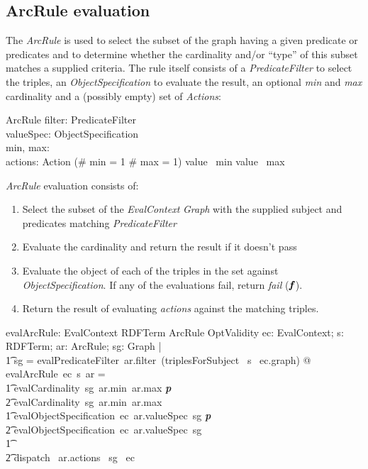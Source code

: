 \documentclass[fuzz]{llncs}
\def\pass{\textbf{\textit{p}}}
\def\fail{\textbf{\textit{f}}}
\def\zc{\textit}
\begin{document}
\subsection{ArcRule evaluation}
The \zc{ArcRule} is used to select the subset of the graph having a given predicate or
predicates and to determine whether the cardinality and/or ``type'' of this subset matches
a supplied criteria. The rule itself consists of a \zc{PredicateFilter} to select the triples,
 an \zc{ObjectSpecification} to evaluate the result, an optional \zc{min} and \zc{max}
 cardinality and a (possibly empty) set of \zc{Actions}:
\begin{schema}{ArcRule}
   filter: PredicateFilter \\
   valueSpec: ObjectSpecification \\
   min, max: \optional[\nat] \\
   actions: \power Action
\where
   (\# min = 1 \land \# max = 1) \implies value~ min \leq value~ max
\end{schema}
\zc{ArcRule} evaluation consists of:
\begin{enumerate}
\item Select the subset of the \zc{EvalContext} \zc{Graph} with the supplied subject and predicates matching  \zc{PredicateFilter}
\item Evaluate the cardinality and return the result if it doesn't pass
\item Evaluate the object of each of the triples in the set against \zc{ObjectSpecification}.  If any of the evaluations fail, return \zc{fail} ($\fail$).
\item Return the result of evaluating \zc{actions} against the matching triples.
\end{enumerate}
\begin{axdef}
   evalArcRule: EvalContext \fun RDFTerm \fun ArcRule \fun OptValidity
\where
   \forall ec: EvalContext; s: RDFTerm; ar: ArcRule; sg: Graph  | \\ 
\t1 sg = evalPredicateFilter~ar.filter~(triplesForSubject~ s~ ec.graph) @ \\
evalArcRule~ec~s~ar = \\
\t1 \IF evalCardinality~sg~ar.min~ar.max \neq \pass \\
\t2 \THEN evalCardinality~sg~ar.min~ar.max \\
\t1 \ELSE \IF evalObjectSpecification~ec~ar.valueSpec~sg \neq \pass \\
\t2 \THEN evalObjectSpecification~ec~ar.valueSpec~sg \\
\t1 \ELSE \\
\t2  dispatch~ ar.actions~ sg~ ec 
\end{axdef}
\end{document}
